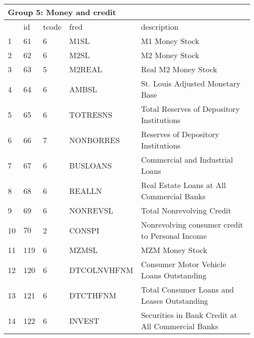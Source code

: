 \begin{table}[ht] 
\centering 
\begin{tabular}{lllll}
\multicolumn{5}{l}{Group 5: Money and credit} \\
\toprule
 & id & tcode & fred & description \\
\midrule
1 & 61 & 6 & M1SL & M1 Money Stock \\
2 & 62 & 6 & M2SL & M2 Money Stock \\
3 & 63 & 5 & M2REAL & Real M2 Money Stock \\
4 & 64 & 6 & AMBSL & St. Louis Adjusted Monetary Base \\
5 & 65 & 6 & TOTRESNS & Total Reserves of Depository Institutions \\
6 & 66 & 7 & NONBORRES & Reserves of Depository Institutions \\
7 & 67 & 6 & BUSLOANS & Commercial and Industrial Loans \\
8 & 68 & 6 & REALLN & Real Estate Loans at All Commercial Banks \\
9 & 69 & 6 & NONREVSL & Total Nonrevolving Credit \\
10 & $70$ & 2 & CONSPI & Nonrevolving consumer credit to Personal Income \\
11 & 119 & 6 & MZMSL & MZM Money Stock \\
12 & 120 & 6 & DTCOLNVHFNM & Consumer Motor Vehicle Loans Outstanding \\
13 & 121 & 6 & DTCTHFNM & Total Consumer Loans and Leases Outstanding \\
14 & 122 & 6 & INVEST & Securities in Bank Credit at All Commercial Banks \\
\bottomrule
\end{tabular}  
\end{table} 